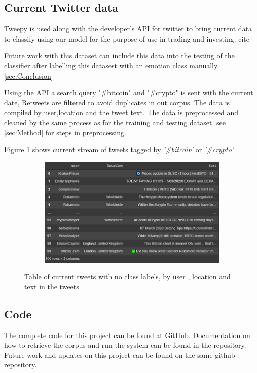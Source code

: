 \documentclass[a4paper, 12pt]{article}
\begin{document}
\subsection{Current Twitter data}
Tweepy is used along with the developer's API for twitter to bring current data to classify using our model for the purpose of use in trading and investing.  \cite{tweepy} cite{}

Future work with this dataset can include this data into the testing of the classifier after labelling this datasest with an emotion class manually. \ref{sec:Conclusion}

Using the API a search query "#bitcoin" and "#crypto" is sent with the current date, Retweets are filtered to avoid duplicates in out corpus. The data is compiled by user,location and the tweet text. The data is preprocessed and cleaned by the same process as for the training and testing dataset. see \ref{sec:Method} for steps in preprocessing.

Figure \ref{fig:currenttweetsdata} shows current stream of tweets tagged by \textit{'#bitcoin'} or \textit{'#crypto'}
\begin{figure}[H]
    \centering
    \begin{subfigure}[b]{0.8\textwidth}
        \includegraphics[width=\textwidth]{res/currenttweets1.png}
    \end{subfigure}
    \caption{Table of current tweets with no class labels, by user , location and text in the tweets}
    \label{fig:currenttweetsdata}
\end{figure}


\subsection{Code}
The complete code for this project can be found at GitHub. \cite{github}
Documentation on how to retrieve the corpus and run the system can be found in the repository.
Future work and updates on this project can be found on the same github repository.
\end{document}
